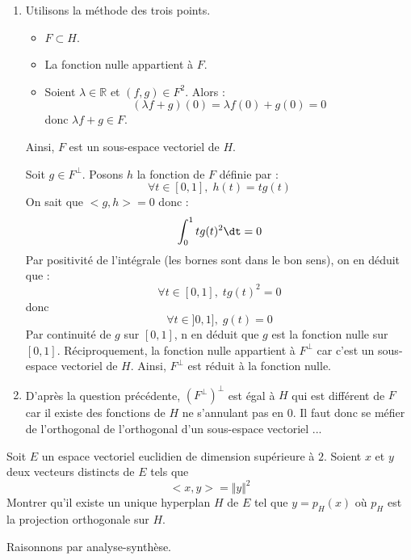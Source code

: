 \documentclass[a4paper,10pt]{report}
\begin{document}
\corr 

\begin{enumerate}
\item Utilisons la méthode des trois points.
\begin{itemize}
\item $F \subset H$.
\item La fonction nulle appartient à $F$.
\item Soient $\lambda \in \mathbb{R}$ et $(f,g) \in F^2$. Alors :
$$ (\lambda f+g)(0) = \lambda f(0)+g(0) = 0$$
donc $\lambda f+g \in F$.
\end{itemize}
Ainsi, $F$ est un sous-espace vectoriel de $H$.

\medskip

\noindent Soit $g \in F^{\perp}$. Posons $h$ la fonction de $F$ définie par :
$$ \forall t \in [0,1], \; h(t)=tg(t)$$
On sait que $<g,h>=0$ donc :
$$ \int_0^1 t g(t)^2 \dt =0$$
Par positivité de l'intégrale (les bornes sont dans le bon sens), on en déduit que :
$$ \forall t \in [0,1], \; t g(t)^2=0$$
donc 
$$ \forall t \in ]0,1], \; g(t)=0$$
Par continuité de $g$ sur $[0,1]$, n en déduit que $g$ est la fonction nulle sur $[0,1]$. Réciproquement, la fonction nulle appartient à $F^{\perp}$ car c'est un sous-espace vectoriel de $H$. Ainsi, $F^{\perp}$ est réduit à la fonction nulle.
\item D'après la question précédente, $(F^{\perp})^{\perp}$ est égal à $H$ qui est différent de $F$ car il existe des fonctions de $H$ ne s'annulant pas en $0$. Il faut donc se méfier de l'orthogonal de l'orthogonal d'un sous-espace vectoriel ...
\end{enumerate}

\begin{Exercice}{} Soit $E$ un espace vectoriel euclidien de dimension supérieure à $2$.  Soient $x$ et $y$ deux vecteurs distincts de $E$ tels que $$< x, y> =\Vert y \Vert^{2}$$
 Montrer qu'il existe un unique hyperplan $H$ de $E$ tel que $y = p_{H}(x)$ où $p_H$ est la projection orthogonale sur $H$.
 \end{Exercice}
 
 \corr Raisonnons par analyse-synthèse.
 
\end{document}
